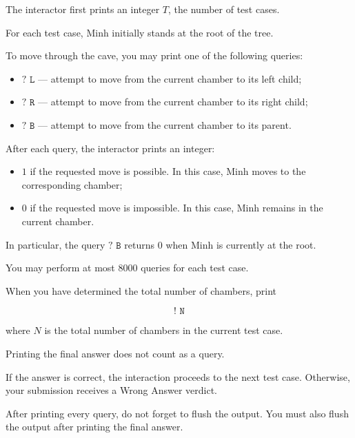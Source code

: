 The interactor first prints an integer $T$, the number of test cases.

For each test case, Minh initially stands at the root of the tree.

To move through the cave, you may print one of the following queries:

\begin{itemize}
\item $\texttt{? L}$ --- attempt to move from the current chamber to its left child;
\item $\texttt{? R}$ --- attempt to move from the current chamber to its right child;
\item $\texttt{? B}$ --- attempt to move from the current chamber to its parent.
\end{itemize}

After each query, the interactor prints an integer:

\begin{itemize}
\item $1$ if the requested move is possible. In this case, Minh moves to the corresponding chamber;
\item $0$ if the requested move is impossible. In this case, Minh remains in the current chamber.
\end{itemize}

In particular, the query $\texttt{? B}$ returns $0$ when Minh is currently at the root.

You may perform at most $8000$ queries for each test case.

When you have determined the total number of chambers, print

$$\texttt{! N}$$

where $N$ is the total number of chambers in the current test case.

Printing the final answer does not count as a query.

If the answer is correct, the interaction proceeds to the next test case. Otherwise, your submission receives a Wrong Answer verdict.

After printing every query, do not forget to flush the output. You must also flush the output after printing the final answer.